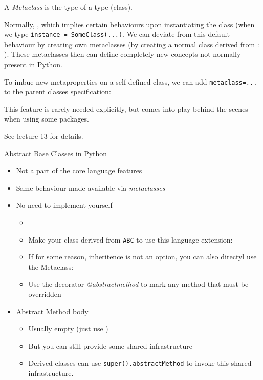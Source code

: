 \begin{frame}
%
\begin{recapbox}[Metaclasses]
\footnotesize
A \emph{Metaclass} is the type of a type (\ie class).

\vspace{5pt}
Normally, , which implies certain behaviours upon instantiating the class (\ie when we type \texttt{instance = SomeClass(...)}.
We can deviate from this default behaviour by creating own metaclasses (by creating a normal class derived from : ).
These metaclasses then can define completely new concepts not normally present in Python.

\vspace{5pt}
To imbue new metaproperties on a self defined class, we can add \texttt{metaclass=...} to the parent classes specification:\\

This feature is rarely needed explicitly, but comes into play behind the scenes when using some packages.

\vspace{5pt}
See lecture 13 for details.
\end{recapbox}
%
\end{frame}


\begin{frame}{Abstract Base Classes in Python}
%
\begin{itemize}
\item Not a part of the core language features
\item Same behaviour made available via \emph{metaclasses}
\item No need to implement yourself
	\begin{itemize}
	\item {}
	\item Make your class derived from \texttt{ABC} to use this language extension: 
	\item If for some reason, inheritence is not an option, you can also directyl use the Metaclass: 
	\item Use the decorator \emph{@abstractmethod} to mark any method that must be overridden
	\end{itemize}
\item Abstract Method body
	\begin{itemize}
	\item Usually empty (just use )
	\item But you can still provide some shared infrastructure
	\item Derived classes can use \texttt{super().abstractMethod} to invoke this shared infrastructure.
	\end{itemize}
\end{itemize}
%
\end{frame}

